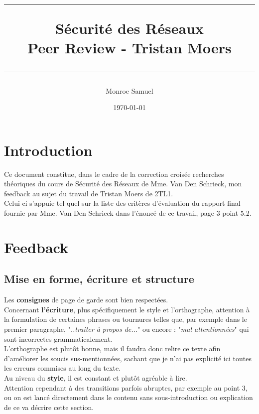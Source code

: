 \documentclass[a4paper,10pt,final,fleqn]{article}
\title{
\parbox{15cm}
{ %
  \vspace{3cm}
	\begin{center}\sf\bfseries\Huge
		\rule{15cm}{1pt}
		\medskip
		Sécurité des Réseaux \\
		\huge Peer Review - Tristan Moers
		\vspace{.5cm}
		\rule{15cm}{1pt}
	\end{center}
	\vspace{3cm}
 }}
\author{Monroe Samuel}
\date{\today}
\begin{document}
\maketitle
\newpage

	\section{Introduction}

		Ce document constitue, dans le cadre de la correction croisée recherches théoriques du cours de Sécurité des Réseaux de Mme. Van Den Schrieck, mon feedback au sujet du travail de Tristan Moers de 2TL1.\\

		Celui-ci s'appuie tel quel sur la liste des critères d'évaluation du rapport final fournie par Mme. Van Den Schrieck dans l'énoncé de ce travail, page 3 point 5.2.\\

	\section{Feedback}

		\subsection{Mise en forme, écriture et structure}

			Les \textbf{consignes} de page de garde sont bien respectées.\\

			Concernant \textbf{l'écriture}, plus spécifiquement le style et l'orthographe, attention à la formulation de certaines phrases ou tournures telles que, par exemple dans le premier paragraphe, "\textit{..traiter à propos de...}" ou encore : "\textit{mal attentionnées}" qui sont incorrectes grammaticalement.\\
			L'orthographe est plutôt bonne, mais il faudra donc relire ce texte afin d'améliorer les soucis sus-mentionnées, sachant que je n'ai pas explicité ici toutes les erreurs commises au long du texte.\\

			Au niveau du \textbf{style}, il est constant et plutôt agréable à lire.\\
			Attention cependant à des transitions parfois abruptes, par exemple au point 3, ou on est lancé directement dans le contenu sans sous-introduction ou explication de ce va décrire cette section.\\
\end{document}
